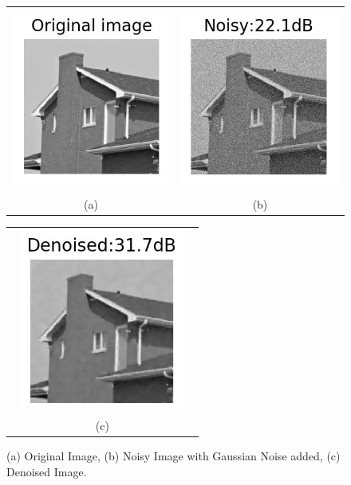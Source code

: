 \documentclass[a4paper, 15pt]{article}
\begin{document}
	\begin{figure}[!h]
		\centering 
		\begin{tabular}{cc}
			\includegraphics[width=6cm, height=6cm]{Original_KSVD.JPG} &\hspace{-8pt}
			\includegraphics[width=6cm, height=6cm]{Noisy_22_1dB_KSVD.JPG}\\
			(a) & (b) \\
		\end{tabular}
		\begin{tabular}{c}
			\includegraphics[width=6cm, height=6cm]{Denoised_31_7_KSVD.JPG}\\ 
			(c)
		\end{tabular}
		\caption{(a) Original Image, (b) Noisy Image with Gaussian Noise added, (c) Denoised Image.}
	\end{figure}
\end{document}

